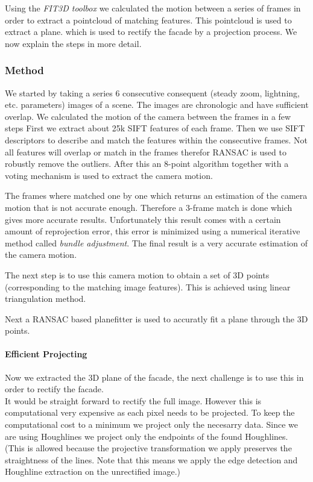 Using the \emph{FIT3D toolbox} we calculated the motion between a series of frames in order to extract a
pointcloud of matching features. This pointcloud is used to extract a plane.
which is used to rectify the facade by a projection process.  We now explain the steps in more detail.

\subsubsection{Method}
We started by taking a series 6 consecutive consequent (steady zoom, lightning, etc. parameters) images of a scene.
The images are chronologic and have sufficient overlap. 
We calculated the motion of the camera between the frames in a few steps
First we extract about 25k SIFT features of each frame.  Then we use
SIFT descriptors to describe and match the features within the consecutive
frames.  Not all features will overlap or match in the frames therefor RANSAC is used to
robustly remove the outliers.  After this an 8-point algorithm together with a
voting mechanism is used to extract the camera motion.

The frames where matched one by one which returns an estimation of the camera
motion that is not accurate enough.  Therefore a 3-frame match is done which
gives more accurate results.  Unfortunately this result comes with a certain
amount of reprojection error, this error is minimized using a numerical
iterative method called \emph{bundle adjustment}.  The final result is a very
accurate estimation of the camera motion.

The next step is to use this camera motion to obtain a set of 3D points
(corresponding to the matching image features).  This is achieved using linear triangulation
method. 

Next a RANSAC based planefitter is used to accuratly fit a plane through
the 3D points. 

\paragraph{Efficient Projecting} 
Now we extracted the 3D plane of the facade, the next challenge is to use this in order to rectify the facade.\\

It would be straight forward to rectify the full image. However this is
computational very expensive as each pixel needs to be projected. To keep the
computational cost to a minimum we project only the necesarry data. Since we
are using Houghlines we project only the endpoints of the found Houghlines. 
(This is allowed because the projective transformation we apply preserves the
straightness of the lines. Note that this means we apply the edge detection and
Houghline extraction on the unrectified image.)\\

